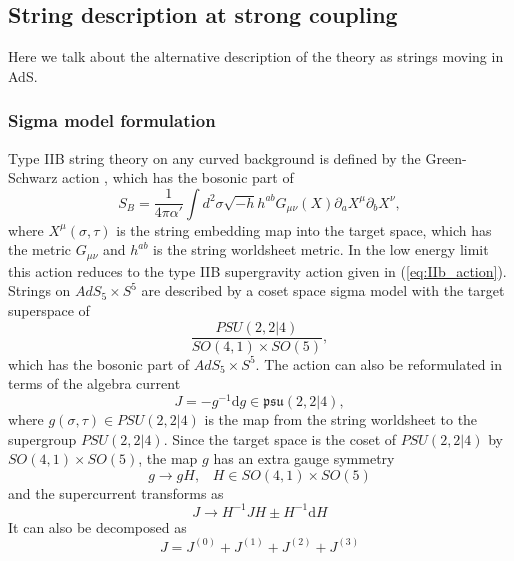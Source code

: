 \subsection{String description at strong coupling}

Here we talk about the alternative description of the theory as strings moving in AdS.

\subsubsection{Sigma model formulation}

Type IIB string theory on any curved background is defined by the Green-Schwarz action \cite{green}, which has the bosonic part of
\begin{equation}
	S_B = \frac{1}{4\pi\alpha'} \int d^2 \sigma \sqrt{-h} h^{ab} G_{\mu\nu}(X) \partial_a X^\mu \partial_b X^\nu,
	\label{eq:gs_action}
\end{equation}
where $X^\mu(\sigma, \tau)$ is the string embedding map into the target space, which has the metric $G_{\mu\nu}$ and $h^{ab}$ is the string worldsheet metric. In the low energy limit this action reduces to the type IIB supergravity action given in (\ref{eq:IIb_action}). Strings on $AdS_5 \times S^5$ are described by a coset space sigma model \cite{tseytlin_nlsm} with the target superspace of
\begin{equation}
	\frac{PSU(2,2|4)}{SO(4,1) \times SO(5)},
\end{equation}
\vspace{1pt}
which has the bosonic part of $AdS_5 \times S^5$. The action can also be reformulated in terms of the algebra current 
\begin{equation}
	J = -g^{-1} \mathrm{d} g \in \mathfrak{psu(2,2|4)},
	\label{eq:j_current}
\end{equation}
where $g(\sigma, \tau) \in PSU(2,2|4)$ is the map from the string worldsheet to the supergroup $PSU(2,2|4)$. Since the target space is the coset of $PSU(2,2|4)$ by $SO(4,1) \times SO(5)$, the map $g$ has an extra gauge symmetry
\begin{equation}
	g \rightarrow gH, \,\,\,\,\, H \in SO(4,1) \times SO(5)
\end{equation}
and the supercurrent transforms as
\begin{equation}
	J \rightarrow H^{-1} J H \pm H^{-1} \mathrm{d} H
	\label{eq:j_gauge}
\end{equation}
It can also be decomposed as 
\begin{equation}
	J = J^{(0)} + J^{(1)} + J^{(2)} + J^{(3)}
\end{equation}
